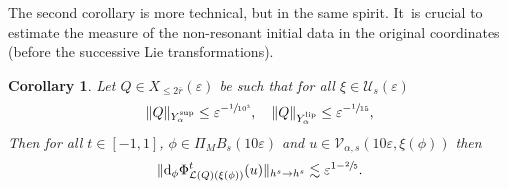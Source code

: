 \documentclass[JEP,XML,SOM,Unicode,published]{cedram}
\theoremstyle{plain}
\newtheorem{corollary}[theorem]{Corollary}
\theoremstyle{definition}
\newcommand{\1}{\mathbf{1}}
\newcommand{\Ysup}[1]{Y_{#1}^{\mathrm{sup}}}
\newcommand{\Ylip}[1]{Y_{#1}^{\mathrm{lip}}}
\let\epsilon\varepsilon
\begin{document}
The second corollary is more technical, but in the same spirit. It~is crucial to estimate the measure of the non-resonant initial data in the original coordinates (\ie before the successive Lie transformations).
\begin{corollary}\label{cor:dxi} Let $Q\in X_{\leq2\overline{r}}(\epsilon)$ be such that for all $\xi\in\mathcal{U}_{s}(\epsilon)$
\[
\|Q\|_{\Ysup{\alpha}}\leq\epsilon^{-\sfrac{1}{10^{3}}},\quad \|Q\|_{\Ylip{\alpha}} \leq \epsilon^{-\sfrac{1}{15}},
\]
Then for all $t\in[-1,1]$, $\phi\in\Pi_{M}B_{s}(10\epsilon)$ and $u\in\mathcal{V}_{\alpha,s}(10\epsilon,\xi(\phi))$ then
\begin{equation}
\label{eq:dxi}
\|
\mathrm{d}_{\phi}\Phi^{t}_{\mathcal{L}(Q)(\xi(\phi))}(u)
\|_{h^{s} \to h^{s}}
\lesssim \epsilon^{1-\sfrac{2}{5}}.
\end{equation}
\end{corollary}
\end{document}
